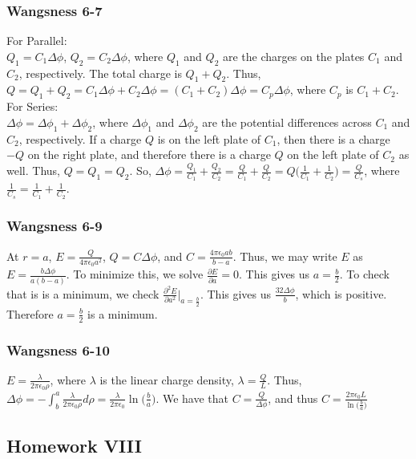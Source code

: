 \documentclass[oneside]{book}
\theoremstyle{mystyle}
\begin{document}
\subsubsection{Wangsness 6-7}
For Parallel:\\
$Q_1 = C_1\Delta \phi$, $Q_2 = C_2\Delta \phi$, where $Q_1$ and $Q_2$ are the charges on the plates $C_1$ and $C_2$, respectively. The total charge is $Q_1+Q_2$. Thus, $Q=Q_1+Q_2 = C_1\Delta\phi + C_2 \Delta \phi =(C_1+C_2)\Delta\phi = C_p \Delta \phi$, where $C_p$ is $C_1+C_2$. \\
For Series:\\
$\Delta \phi = \Delta\phi_1 + \Delta \phi_2$, where $\Delta\phi_1$ and $\Delta \phi_2$ are the potential differences across $C_1$ and $C_2$, respectively. If a charge $Q$ is on the left plate of $C_1$, then there is a charge $-Q$ on the right plate, and therefore there is a charge $Q$ on the left plate of $C_2$ as well. Thus, $Q=Q_1=Q_2$. So, $\Delta \phi = \frac{Q_1}{C_1} + \frac{Q_2}{C_2} = \frac{Q}{C_1}+\frac{Q}{C_2} = Q\big(\frac{1}{C_1}+\frac{1}{C_2}\big) = \frac{Q}{C_s}$, where $\frac{1}{C_s} = \frac{1}{C_1}+\frac{1}{C_2}$.
\subsubsection{Wangsness 6-9}
At $r=a$, $E=\frac{Q}{4\pi \epsilon_0 a^2}$, $Q=C\Delta \phi$, and $C=\frac{4\pi \epsilon_0 ab}{b-a}$. Thus, we may write $E$ as $E=\frac{b\Delta \phi}{a(b-a)}$. To minimize this, we solve $\frac{\partial E}{\partial a} = 0$. This gives us $a=\frac{b}{2}$. To check that is is a minimum, we check $\frac{\partial^2 E}{\partial a^2}\bigg|_{a=\frac{b}{2}}$. This gives us $\frac{32\Delta \phi}{b}$, which is positive. Therefore $a=\frac{b}{2}$ is a minimum.
\subsubsection{Wangsness 6-10}
$E=\frac{\lambda}{2\pi \epsilon_0 \rho}$, where $\lambda$ is the linear charge density, $\lambda = \frac{Q}{L}$. Thus, $\Delta\phi = - \int_{b}^{a} \frac{\lambda}{2\pi \epsilon_0\rho}d\rho = \frac{\lambda}{2\pi \epsilon_0}\ln\big(\frac{b}{a}\big)$. We have that $C=\frac{Q}{\Delta\phi}$, and thus $C = \frac{2\pi \epsilon_0 L}{\ln\big(\frac{b}{a}\big)}$
\subsection{Homework VIII}
\end{document}
